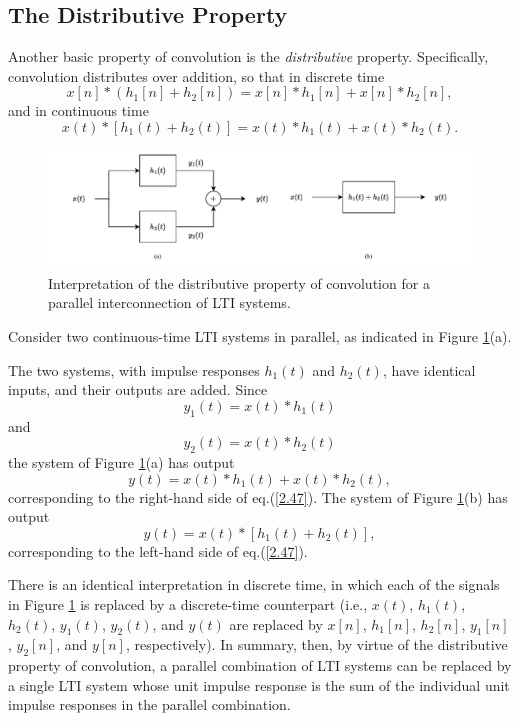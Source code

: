 \documentclass[a4paper,10pt,twoside]{book}
\begin{document}
\subsection{The Distributive Property}

Another basic property of convolution is the \textit{distributive} property. Specifically, convolution distributes over addition, so that in discrete time
\begin{equation}
    x[n]*(h_{1}[n]+h_{2}[n])= x[n]*h_{1}[n]+ x[n]*h_{2}[n],
    \label{2.46}
\end{equation}
and in continuous time
\begin{equation}
    x(t)*[h_{1}(t)+h_{2}(t)]=x(t)*h_{1}(t)+x(t)*h_{2}(t).
    \label{2.47}
\end{equation}

\begin{figure}[htbp]
    \centering
    \includegraphics[width=\linewidth]{Fig5.pdf}
    \caption{Interpretation of the distributive property of convolution for a parallel interconnection of LTI systems.}
    \label{Fig5}
\end{figure}

Consider two continuous-time LTI systems in parallel, as indicated in Figure \ref{Fig5}(a).

The two systems, with impulse responses $h_1(t)$ and $h_2(t)$, have identical inputs, and their outputs are added. Since $$y_1(t)=x(t)*h_1(t)$$ and $$y_2(t)=x(t)*h_2(t)$$ the system of Figure \ref{Fig5}(a) has output
\begin{equation}
    y(t) = x(t)*h_1(t)+x(t)*h_2(t),
    \label{2.48}
\end{equation}
corresponding to the right-hand side of eq.\;(\ref{2.47}). The system of Figure \ref{Fig5}(b) has output
\begin{equation}
    y(t) = x(t)*[h_1(t)+h_2(t)],
    \label{2.49}
\end{equation}
corresponding to the left-hand side of eq.\;(\ref{2.47}).

There is an identical interpretation in discrete time, in which each of the signals in Figure \ref{Fig5} is replaced by a discrete-time counterpart (i.e., $x(t)$, $h_1(t)$, $h_2(t)$, $y_1(t)$, $y_2(t)$, and $y(t)$ are replaced by $x[n]$, $h_1[n]$, $h_2[n]$, $y_1[n]$, $y_2[n]$, and $y[n]$, respectively). In summary, then, by virtue of the distributive property of convolution, a parallel combination of LTI systems can be replaced by a single LTI system whose unit impulse response is the sum of the individual unit impulse responses in the parallel combination.
\end{document}
